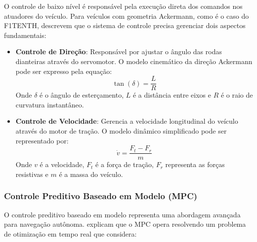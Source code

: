 O controle de baixo nível é responsável pela execução direta dos comandos nos
atuadores do veículo. Para veículos com geometria Ackermann, como é o caso do
F1TENTH, \cite{Babu2020Simulator} descrevem que o sistema de controle precisa
gerenciar dois aspectos fundamentais:

\begin{itemize}
    \item \textbf{Controle de Direção}: Responsável por ajustar o ângulo das rodas dianteiras através do servomotor. O modelo cinemático da direção Ackermann pode ser expresso pela equação:
          \begin{equation}
              \tan(\delta) = \frac{L}{R}
          \end{equation}
          Onde $\delta$ é o ângulo de esterçamento, $L$ é a distância entre eixos e $R$ é o raio de curvatura instantâneo.

    \item \textbf{Controle de Velocidade}: Gerencia a velocidade longitudinal do veículo através do motor de tração. O modelo dinâmico simplificado pode ser representado por:
          \begin{equation}
              \dot{v} = \frac{F_t - F_r}{m}
          \end{equation}
          Onde $v$ é a velocidade, $F_t$ é a força de tração, $F_r$ representa as forças resistivas e $m$ é a massa do veículo.
\end{itemize}

\subsubsection{Controle Preditivo Baseado em Modelo (MPC)}

O controle preditivo baseado em modelo representa uma abordagem avançada para
navegação autônoma. \cite{Stachowicz2023FastRLAP} explicam que o MPC opera
resolvendo um problema de otimização em tempo real que considera:

